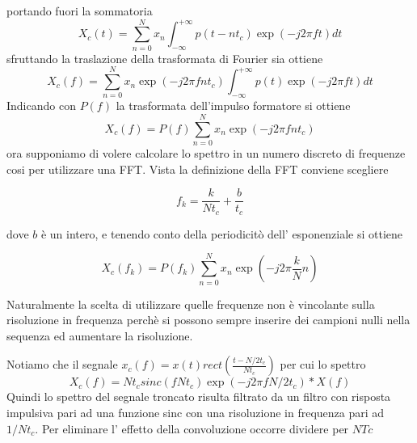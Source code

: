 \documentclass[10pt,a4paper]{book}
\begin{document}
portando fuori la sommatoria 
\begin{equation}
X_c(t) = \sum_{n = 0}^{N} x_n \int_{-\infty}^{+\infty} p(t-n t_c) \exp(-j 2 \pi f t) dt
\end{equation}
sfruttando la traslazione della trasformata di Fourier sia ottiene 
\begin{equation}
X_c(f) = \sum_{n = 0}^{N} x_n \exp(-j 2 \pi f n t_c)\int_{-\infty}^{+\infty} p(t) \exp(-j 2 \pi f t) dt
\end{equation}
Indicando con $P(f)$ la trasformata dell'impulso formatore si ottiene
\begin{equation}
X_c(f) = P(f)\sum_{n = 0}^{N} x_n \exp(-j 2 \pi f n t_c)
\end{equation}
ora supponiamo di volere calcolare  lo spettro in un numero discreto di frequenze cosi per utilizzare una FFT. Vista la definizione della FFT conviene scegliere

\begin{equation}
f_k = \frac{k}{N t_c} + \frac{b}{t_c}
\end{equation}

dove $b$ è un intero, e tenendo conto della periodicitò dell' esponenziale si ottiene 

\begin{equation}
X_c(f_k) = P(f_k)\sum_{n = 0}^{N} x_n \exp \left(-j 2 \pi  \frac{k}{N} n \right)
\end{equation}

Naturalmente la scelta di utilizzare quelle frequenze non è vincolante sulla risoluzione in frequenza perchè si possono sempre inserire dei campioni nulli nella sequenza ed aumentare la risoluzione.

Notiamo che il segnale $x_c(f) = x(t) rect(\frac{t - N/2 t_c}{N t_c})$ per cui lo spettro 
\begin{equation}
X_c(f) = N t_c sinc\left(f N t_c\right) \exp \left(-j 2 \pi f N/2 t_c\right ) * X(f)
\end{equation}
Quindi lo spettro del segnale troncato risulta filtrato da un filtro con risposta impulsiva pari ad una funzione sinc con una risoluzione in frequenza pari ad $1/ N t_c$. Per eliminare l' effetto della convoluzione occorre dividere per $N Tc$
\end{document}
